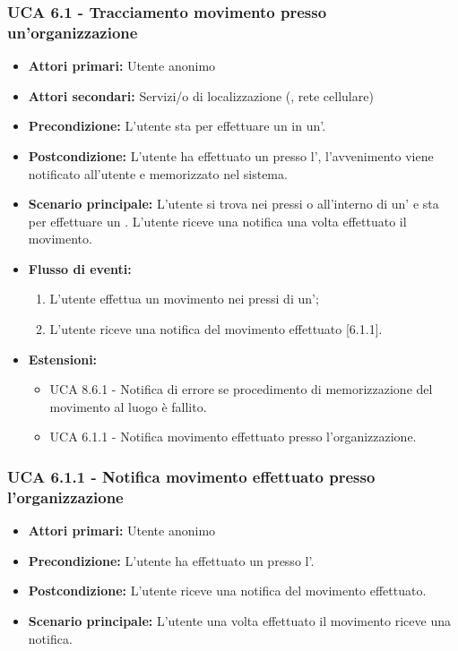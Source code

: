 \subsubsection{UCA 6.1 - Tracciamento movimento presso un'organizzazione}
\begin{itemize}
	\item \textbf{Attori primari:} Utente anonimo
	\item \textbf{Attori secondari:} Servizi/o di localizzazione (, rete cellulare)
	\item \textbf{Precondizione:} L'utente sta per effettuare un  in un'.
	\item \textbf{Postcondizione:} L'utente ha effettuato un  presso l', l'avvenimento viene notificato all'utente e memorizzato nel sistema. 
	\item \textbf{Scenario principale:} L'utente si trova nei pressi o all'interno di un' e sta per effettuare un . L'utente riceve una notifica una volta effettuato il movimento.
	\item \textbf{Flusso di eventi:}
	\begin{enumerate}
		\item L'utente effettua un movimento nei pressi di un';
		\item L'utente riceve una notifica del movimento effettuato [6.1.1].
	\end{enumerate}
	\item \textbf{Estensioni:}
	\begin{itemize}
		\item UCA 8.6.1 - Notifica di errore se procedimento di memorizzazione del movimento al luogo è fallito.
		\item UCA 6.1.1 - Notifica movimento effettuato presso l'organizzazione.
	\end{itemize}
\end{itemize}

\subsubsection{UCA 6.1.1 - Notifica movimento effettuato presso l'organizzazione}
\begin{itemize}
	\item \textbf{Attori primari:} Utente anonimo
	\item \textbf{Precondizione:} L'utente ha effettuato un  presso l'.
	\item \textbf{Postcondizione:} L'utente riceve una notifica del movimento effettuato.
	\item \textbf{Scenario principale:} L'utente una volta effettuato il movimento riceve una notifica.	
\end{itemize}

